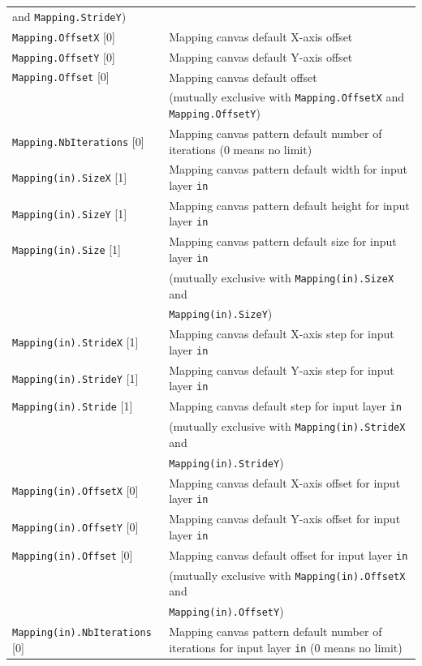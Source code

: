\documentclass[a4paper,11pt,oneside]{article}
\begin{document}
\begin{center}
\begin{longtable}{| p{5cm} | p{10cm} | }
   and \lstinline!Mapping.StrideY!) \\
  \lstinline!Mapping.OffsetX! [0] & Mapping canvas default X-axis offset \\
  \lstinline!Mapping.OffsetY! [0] & Mapping canvas default Y-axis offset \\
  \lstinline!Mapping.Offset! [0] & Mapping canvas default offset \\
   & (mutually exclusive with \lstinline!Mapping.OffsetX!
   and \lstinline!Mapping.OffsetY!) \\
  \lstinline!Mapping.NbIterations! [0] & Mapping canvas pattern default number
   of iterations (0 means no limit) \\
  \lstinline!Mapping(in).SizeX! [1] & Mapping canvas pattern default width
  for input layer \lstinline!in! \\
  \lstinline!Mapping(in).SizeY! [1] & Mapping canvas pattern default height
   for input layer \lstinline!in! \\
  \lstinline!Mapping(in).Size! [1] & Mapping canvas pattern default size
  for input layer \lstinline!in! \\
   & (mutually exclusive with \lstinline!Mapping(in).SizeX! and \\
   & \lstinline!Mapping(in).SizeY!) \\
  \lstinline!Mapping(in).StrideX! [1] & Mapping canvas default X-axis step
   for input layer \lstinline!in! \\
  \lstinline!Mapping(in).StrideY! [1] & Mapping canvas default Y-axis step
  for input layer \lstinline!in! \\
  \lstinline!Mapping(in).Stride! [1] & Mapping canvas default step
  for input layer \lstinline!in! \\
   & (mutually exclusive with \lstinline!Mapping(in).StrideX! and \\
   & \lstinline!Mapping(in).StrideY!) \\
  \lstinline!Mapping(in).OffsetX! [0] & Mapping canvas default X-axis offset
  for input layer \lstinline!in! \\
  \lstinline!Mapping(in).OffsetY! [0] & Mapping canvas default Y-axis offset
  for input layer \lstinline!in! \\
  \lstinline!Mapping(in).Offset! [0] & Mapping canvas default offset for input
   layer \lstinline!in! \\
   & (mutually exclusive with \lstinline!Mapping(in).OffsetX! and \\
   & \lstinline!Mapping(in).OffsetY!) \\
  \lstinline!Mapping(in).NbIterations! [0] & Mapping canvas pattern default
  number of iterations for input layer \lstinline!in! (0 means no limit) \\
 \hline
\end{longtable}
\end{center}
\end{document}
